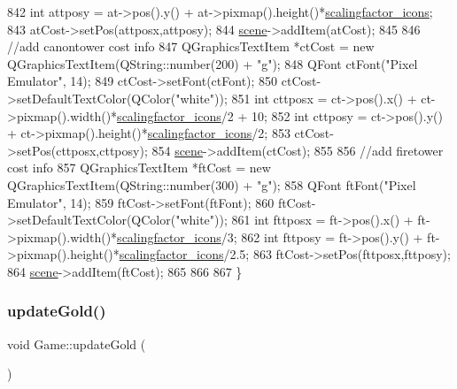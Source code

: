 \begin{DoxyCode}
842     \textcolor{keywordtype}{int} attposy = at->pos().y() + at->pixmap().height()*\hyperlink{class_game_a50835e7c47a3e5d6fc919ce3a163be88}{scalingfactor\_icons};
843     atCost->setPos(attposx,attposy);
844     \hyperlink{class_game_a8119e3b9a632906c6808fa294b46a92a}{scene}->addItem(atCost);
845 
846     \textcolor{comment}{//add canontower cost info}
847     QGraphicsTextItem *ctCost = \textcolor{keyword}{new} QGraphicsTextItem(QString::number(200) + \textcolor{stringliteral}{"g"});
848     QFont ctFont(\textcolor{stringliteral}{"Pixel Emulator"}, 14);
849     ctCost->setFont(ctFont);
850     ctCost->setDefaultTextColor(QColor(\textcolor{stringliteral}{"white"}));
851     \textcolor{keywordtype}{int} cttposx = ct->pos().x() + ct->pixmap().width()*\hyperlink{class_game_a50835e7c47a3e5d6fc919ce3a163be88}{scalingfactor\_icons}/2 + 10;
852     \textcolor{keywordtype}{int} cttposy = ct->pos().y() + ct->pixmap().height()*\hyperlink{class_game_a50835e7c47a3e5d6fc919ce3a163be88}{scalingfactor\_icons}/2;
853     ctCost->setPos(cttposx,cttposy);
854     \hyperlink{class_game_a8119e3b9a632906c6808fa294b46a92a}{scene}->addItem(ctCost);
855 
856     \textcolor{comment}{//add firetower cost info}
857     QGraphicsTextItem *ftCost = \textcolor{keyword}{new} QGraphicsTextItem(QString::number(300) + \textcolor{stringliteral}{"g"});
858     QFont ftFont(\textcolor{stringliteral}{"Pixel Emulator"}, 14);
859     ftCost->setFont(ftFont);
860     ftCost->setDefaultTextColor(QColor(\textcolor{stringliteral}{"white"}));
861     \textcolor{keywordtype}{int} fttposx = ft->pos().x() + ft->pixmap().width()*\hyperlink{class_game_a50835e7c47a3e5d6fc919ce3a163be88}{scalingfactor\_icons}/3;
862     \textcolor{keywordtype}{int} fttposy = ft->pos().y() + ft->pixmap().height()*\hyperlink{class_game_a50835e7c47a3e5d6fc919ce3a163be88}{scalingfactor\_icons}/2.5;
863     ftCost->setPos(fttposx,fttposy);
864     \hyperlink{class_game_a8119e3b9a632906c6808fa294b46a92a}{scene}->addItem(ftCost);
865 
866 
867 \}
\end{DoxyCode}
\mbox{\label{class_game_a065998f7609f63e2987ede928359595a}} 
\subsubsection{\texorpdfstring{update\+Gold()}{updateGold()}}
{\footnotesize\ttfamily void Game\+::update\+Gold (\begin{DoxyParamCaption}{ }\end{DoxyParamCaption})}



